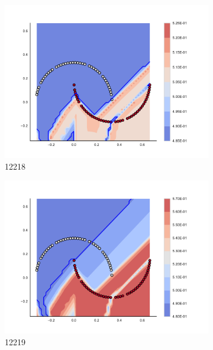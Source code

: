 \begin{figure}[h]
\begin{subfigure}[b]{0.09\textwidth}
    \includegraphics[clip, trim=2.35cm 1.75cm 4.5cm 0cm,width=\textwidth]{img/convergence/12218.pdf}
    \caption{12218}
    \label{fig:convergence_12218}
\end{subfigure}
%
\begin{subfigure}[b]{0.09\textwidth}
    \includegraphics[clip, trim=2.35cm 1.75cm 4.5cm 0cm,width=\textwidth]{img/convergence/12219.pdf}
    \caption{12219}
    \label{fig:convergence_12219}
\end{subfigure}
%
\begin{subfigure}[b]{0.09\textwidth}

\end{subfigure}
\end{figure}
